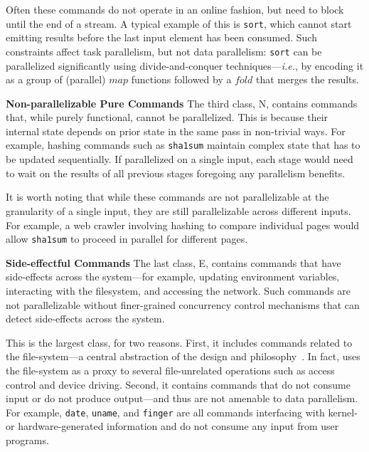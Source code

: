 \documentclass[letterpaper,twocolumn,10pt]{article}
\newcommand{\ie}{{\em i.e.}, }
\newcommand{\heading}[1]{\vspace{4pt}\noindent\textbf{#1}\enspace}
\newcommand{\ttt}[1]{\texttt{#1}}
\newcommand{\cn}[1]{\mbox{\textcircled{\footnotesize #1}}}
\newcommand{\npu}{\cn{\textsc{N}}\xspace}
\newcommand{\sid}{\cn{\textsc{E}}\xspace}
\newcommand{\nv}[1]{[{\color{cyan}nv: #1}]}
\newcommand{\kk}[1]{[{\color{magenta}kk: #1}]}
\begin{document}
Often these commands do not operate in an online fashion, but need to block until the end of a stream.
A typical example of this is \ttt{sort}, which cannot start emitting results before the last input element has been consumed.
Such constraints affect task parallelism, but not data parallelism:
  \ttt{sort} can be parallelized significantly using divide-and-conquer techniques---\ie by encoding it as a group of (parallel) $map$ functions followed by a $fold$ that merges the results.


\heading{Non-parallelizable Pure Commands}
The third class, \npu, contains commands that, while purely functional, cannot be parallelized.
This is because their internal state depends on prior state in the same pass in non-trivial ways. %
For example, hashing commands such as \ttt{sha1sum} maintain complex state that has to be updated sequentially.
If parallelized on a single input, each stage would need to wait on the results of all previous stages foregoing any parallelism benefits.

It is worth noting that while these commands are not parallelizable at the granularity of a single input, they are still parallelizable across different inputs.
For example, a web crawler involving hashing to compare individual pages would allow \ttt{sha1sum} to proceed in parallel for different pages.

\heading{Side-effectful Commands}
The last class, \sid, contains commands that have side-effects across the system---for example, updating environment variables, interacting with the filesystem, and accessing the network.
Such commands are not parallelizable without finer-grained concurrency control mechanisms that can detect side-effects across the system.

This is the largest class, for two reasons.
First, it includes commands related to the file-system---a central abstraction of the \unix design and philosophy~\cite{unix}.
In fact, \unix uses the file-system as a proxy to several file-unrelated operations such as access control and device driving. %
Second, it contains commands that do not consume input or do not produce output---and thus are not amenable to data parallelism.
For example, \ttt{date}, \ttt{uname}, and \ttt{finger} are all commands interfacing with kernel- or hardware-generated information and do not consume any input from user programs.
\end{document}
